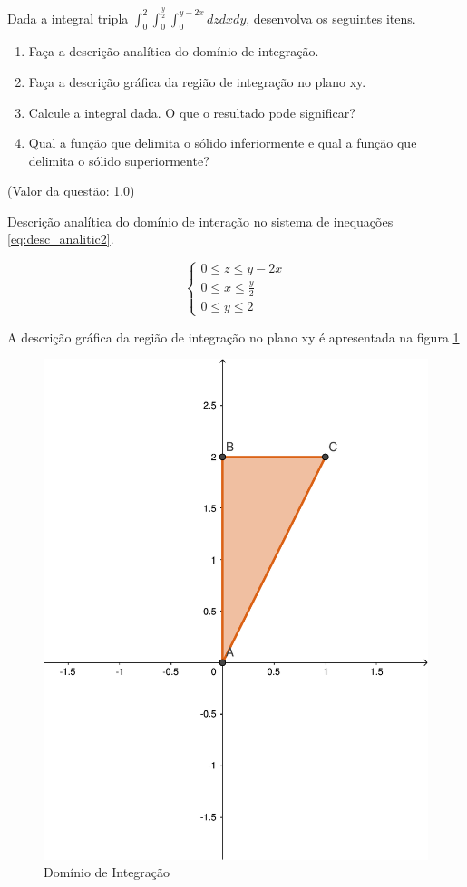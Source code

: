 \documentclass[10pt,a4paper]{article}
\begin{document}
	Dada a integral tripla $ \int_{0}^{2} \int_{0}^{\frac{y}{2}} \int_{0}^{y-2x} dz dx dy $, desenvolva os seguintes itens.
	
	\begin{enumerate}[a]
		\item Faça a descrição analítica do domínio de integração.
		\item Faça a descrição gráfica da região de integração no plano xy.
		\item Calcule a integral dada. O que o resultado pode significar?
		\item Qual a função que delimita o sólido inferiormente e qual a função que delimita o sólido superiormente?
	\end{enumerate}
	
	(Valor da questão: 1,0)
	
	Descrição analítica do domínio de interação no sistema de inequações \ref{eq:desc_analitic2}.
	
	\begin{equation} \label{eq:desc_analitic2}
		\left\{
			\begin{array}{l}
				0 \le z \le y - 2x \\
				0 \le x \le \frac{y}{2} \\
				0 \le y \le 2
			\end{array}
		\right.
	\end{equation}
	
	A descrição gráfica da região de integração no plano xy é apresentada na figura \ref{fig:integrais-multiplas-2a}
	
	\begin{figure}[h]
		\centering
		\includegraphics[width=0.7\linewidth]{fig/integrais-multiplas-2a}
		\caption{Domínio de Integração}
		\label{fig:integrais-multiplas-2a}
	\end{figure}
	
\end{document}
